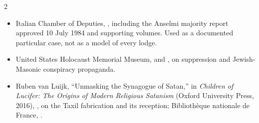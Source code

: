 \begin{multicols}{2}
{\begin{itemize}[itemsep=0.1em,topsep=0.15em]
\item Italian Chamber of Deputies, , including the Anselmi majority report approved 10 July 1984 and supporting volumes. Used as a documented particular case, not as a model of every lodge.
\item United States Holocaust Memorial Museum,  and , on suppression and Jewish-Masonic conspiracy propaganda.
\item Ruben van Luijk, “Unmasking the Synagogue of Satan,” in \emph{Children of Lucifer: The Origins of Modern Religious Satanism} (Oxford University Press, 2016), , on the Taxil fabrication and its reception; Bibliothèque nationale de France, .
\end{itemize}}

\end{multicols}
\endgroup
